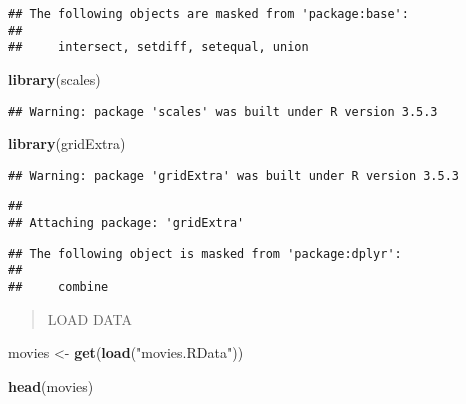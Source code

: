 \documentclass[]{article}
\newenvironment{Shaded}{\begin{snugshade}}{\end{snugshade}}
\newcommand{\KeywordTok}[1]{\textcolor[rgb]{0.13,0.29,0.53}{\textbf{#1}}}
\newcommand{\StringTok}[1]{\textcolor[rgb]{0.31,0.60,0.02}{#1}}
\newcommand{\NormalTok}[1]{#1}
\begin{document}
\begin{verbatim}
## The following objects are masked from 'package:base':
## 
##     intersect, setdiff, setequal, union
\end{verbatim}

\begin{Shaded}
\begin{Highlighting}[]
\KeywordTok{library}\NormalTok{(scales)}
\end{Highlighting}
\end{Shaded}

\begin{verbatim}
## Warning: package 'scales' was built under R version 3.5.3
\end{verbatim}

\begin{Shaded}
\begin{Highlighting}[]
\KeywordTok{library}\NormalTok{(gridExtra)}
\end{Highlighting}
\end{Shaded}

\begin{verbatim}
## Warning: package 'gridExtra' was built under R version 3.5.3
\end{verbatim}

\begin{verbatim}
## 
## Attaching package: 'gridExtra'
\end{verbatim}

\begin{verbatim}
## The following object is masked from 'package:dplyr':
## 
##     combine
\end{verbatim}

\begin{quote}
LOAD DATA
\end{quote}

\begin{Shaded}
\begin{Highlighting}[]
\NormalTok{movies <-}\StringTok{ }\KeywordTok{get}\NormalTok{(}\KeywordTok{load}\NormalTok{(}\StringTok{"movies.RData"}\NormalTok{))}
\end{Highlighting}
\end{Shaded}

\begin{Shaded}
\begin{Highlighting}[]
\KeywordTok{head}\NormalTok{(movies)}
\end{Highlighting}
\end{Shaded}
\end{document}

